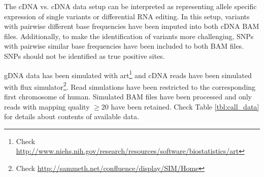 \documentclass[10pt,a4paper]{article} \usepackage[utf8]{inputenc}
\begin{document}
The cDNA vs. cDNA data setup can be interpreted as representing allele specific expression of single
variants or differential RNA editing. In this setup, variants with pairwise different base
frequencies have been imputed into both cDNA BAM files. Additionally, to make the identification of
variants more challenging, SNPs with pairwise similar base frequencies have been included to both
BAM files. SNPs should not be identified as true positive sites.

gDNA data has been simulated with art\footnote{Check
\url{http://www.niehs.nih.gov/research/resources/software/biostatistics/art}} and cDNA reads
have been simulated with flux simulator\footnote{Check \url{http://sammeth.net/confluence/display/SIM/Home}}.
Read simulations have been restricted to the corresponding first chromosome of human. Simulated BAM
files have been processed and only reads with mapping quality $\ge 20$ have been retained. Check
Table \ref{tbl:call_data} for details about contents of available data.
\end{document}

